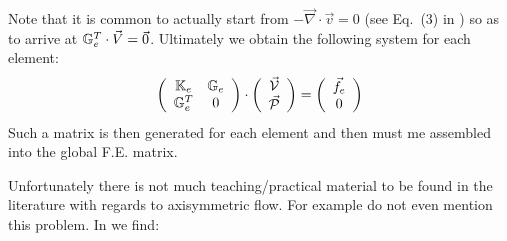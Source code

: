 
Note that it is common to actually start from $- \vec\nabla\cdot\vec v=0$ 
(see Eq.~(3) in \cite{mabl14})
so as to arrive at ${\mathbb{G}}_e^T \cdot {\vec V}=\vec 0$.
Ultimately we obtain the following system for each element:
\[
\left(
\begin{array}{cc}
{\mathbb{K}}_e & {\mathbb{G}}_e \\
{\mathbb{G}}_e^T & 0
\end{array}
\right)
\cdot
\left(
\begin{array}{c}
\vec{\cal V} \\ \vec{\cal P} 
\end{array}
\right)
=
\left(
\begin{array}{c}
\vec{f}_e \\ 0 
\end{array}
\right)
\]
Such a matrix is then generated for each element and then must me assembled into the
global F.E. matrix.

Unfortunately there is not much teaching/practical material to be found 
in the literature with regards to axisymmetric flow. For example 
\textcite{dohu03} do not even mention this problem. 
In \textcite{hugh} we find:

